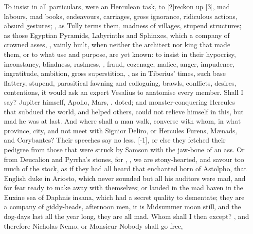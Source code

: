 {To insist in all particulars, were an Herculean task, to
[2\baselineskip]reckon up [3\baselineskip], mad labours, mad books, endeavours, carriages, gross ignorance,
ridiculous actions, absurd gestures; , as Tully terms them, madness of villages, stupend
structures; as those Egyptian Pyramids, Labyrinths and Sphinxes, which
a company of crowned asses, , vainly built, when
neither the architect nor king that made them, or to what use and
purpose, are yet known: to insist in their hypocrisy, inconstancy,
blindness, rashness, , fraud, cozenage, malice,
anger, impudence, ingratitude, ambition, gross superstition,
, as in Tiberius' times, such
base flattery, stupend, parasitical fawning and colloguing, \etc{} brawls,
conflicts, desires, contentions, it would ask an expert Vesalius to
anatomise every member. Shall I say? Jupiter himself, Apollo, Mars, \etc.
doted; and monster-conquering Hercules that subdued the world, and
helped others, could not relieve himself in this, but mad he was at
last. And where shall a man walk, converse with whom, in what province,
city, and not meet with Signior Deliro, or Hercules Furens, M\ae{}nads,
and Corybantes? Their speeches say no less. [-1\baselineskip],
or else they fetched their pedigree from those that were struck by
Samson with the jaw-bone of an ass. Or from Deucalion and Pyrrha's
stones, for ,  , we are
stony-hearted, and savour too much of the stock, as if they had all
heard that enchanted horn of Astolpho, that English duke in Ariosto,
which never sounded but all his auditors were mad, and for fear ready
to make away with themselves; or landed in the mad haven in the
Euxine sea of Daphnis insana, which had a secret quality to dementate;
they are a company of giddy-heads, afternoon men, it is Midsummer moon
still, and the dog-days last all the year long, they are all mad. Whom
shall I then except?   , \etc{} and therefore Nicholas Nemo,
or Monsieur Nobody shall go free, }
